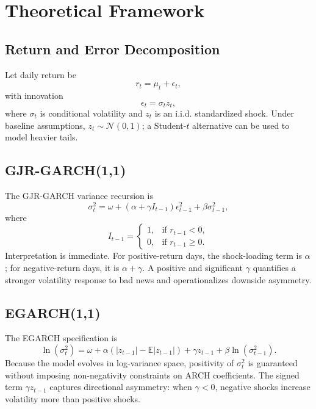 \documentclass[12pt]{article}
\begin{document}
\section{Theoretical Framework}
\subsection{Return and Error Decomposition}
Let daily return be
\begin{equation}
    r_t = \mu_t + \epsilon_t,
\end{equation}
with innovation
\begin{equation}
    \epsilon_t = \sigma_t z_t,
\end{equation}
where $\sigma_t$ is conditional volatility and $z_t$ is an i.i.d. standardized shock. Under baseline assumptions, $z_t \sim \mathcal{N}(0,1)$; a Student-$t$ alternative can be used to model heavier tails.

\subsection{GJR-GARCH(1,1)}
The GJR-GARCH variance recursion is
\begin{equation}
    \sigma_t^2 = \omega + (\alpha + \gamma I_{t-1})\epsilon_{t-1}^2 + \beta\sigma_{t-1}^2,
\end{equation}
where
\begin{equation}
    I_{t-1} = \begin{cases}
        1, & \text{if } r_{t-1} < 0,\\
        0, & \text{if } r_{t-1} \ge 0.
    \end{cases}
\end{equation}
Interpretation is immediate. For positive-return days, the shock-loading term is $\alpha$; for negative-return days, it is $\alpha + \gamma$. A positive and significant $\gamma$ quantifies a stronger volatility response to bad news and operationalizes downside asymmetry.

\subsection{EGARCH(1,1)}
The EGARCH specification is
\begin{equation}
\ln(\sigma_t^2)=\omega + \alpha\left(|z_{t-1}|-\mathbb{E}|z_{t-1}|\right)+\gamma z_{t-1}+\beta\ln(\sigma_{t-1}^2).
\end{equation}
Because the model evolves in log-variance space, positivity of $\sigma_t^2$ is guaranteed without imposing non-negativity constraints on ARCH coefficients. The signed term $\gamma z_{t-1}$ captures directional asymmetry: when $\gamma<0$, negative shocks increase volatility more than positive shocks.
\end{document}
